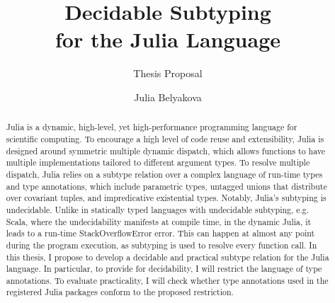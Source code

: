 \title{Decidable Subtyping\\for the Julia Language}
\subtitle{Thesis Proposal}

\author{Julia Belyakova}

\date{}

\maketitle


\begin{abstract}

Julia is a dynamic, high-level, yet high-performance programming language
for scientific computing.
To encourage a high level of code reuse and extensibility, Julia is
designed around symmetric multiple dynamic dispatch, which allows functions
to have multiple implementations tailored to different argument types.
To resolve multiple dispatch, Julia relies on a subtype relation over a complex
language of run-time types and type annotations, which include parametric types,
untagged unions that distribute over covariant tuples, and impredicative
existential types.
Notably, Julia's subtyping is undecidable.
Unlike in statically typed languages
with undecidable subtyping, e.g. Scala, where the undecidability manifests at
compile time, in the dynamic Julia, it leads to a run-time
StackOverflowError error. This can happen
at almost any point during the program execution, as subtyping is used to
resolve every function call.
In this thesis, I propose to develop a decidable and practical subtype relation
for the Julia language.
In particular, to provide for decidability, I will restrict the language of type
annotations. To evaluate practicality, I will check whether type annotations
used in the registered Julia packages conform to the proposed restriction.

\end{abstract}
